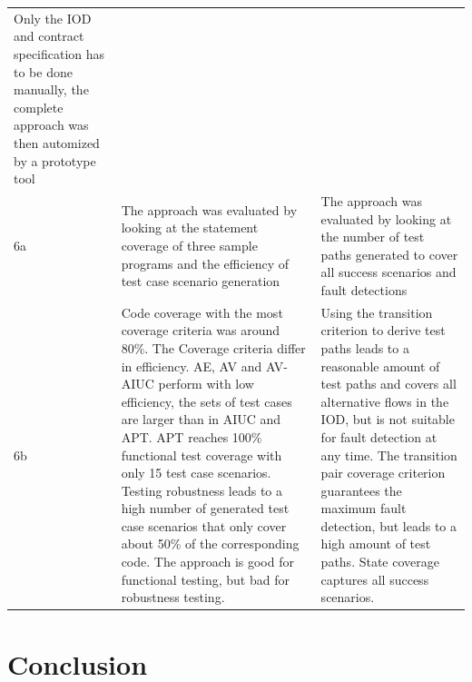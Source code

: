 \begin{longtable}[h]{p{0.5cm}p{}p{}}
	Only the IOD and contract specification has to be done manually, the complete approach was then automized by a prototype tool \\
	6a & 
	The approach was evaluated by looking at the statement coverage of three sample programs and the efficiency of test case scenario generation & 
	The approach was evaluated by looking at the number of test paths generated to cover all success scenarios and fault detections \\
	6b &
	Code coverage with the most coverage criteria was around 80\%. The Coverage criteria differ in efficiency. AE, AV and AV-AIUC perform with low efficiency, the sets of test cases are larger than in AIUC and APT. APT reaches 100\% functional test coverage with only 15 test case scenarios. Testing robustness leads to a high number of generated test case scenarios that only cover about 50\% of the corresponding code. The approach is good for functional testing, but bad for robustness testing. &
	Using the transition criterion to derive test paths leads to a reasonable amount of test paths and covers all alternative flows in the IOD, but is not suitable for fault detection at any time. The transition pair coverage criterion guarantees the maximum fault detection, but leads to a high amount of test paths. State coverage captures all success scenarios. \\
\end{longtable}

\section{Conclusion} \label{conclusion}

